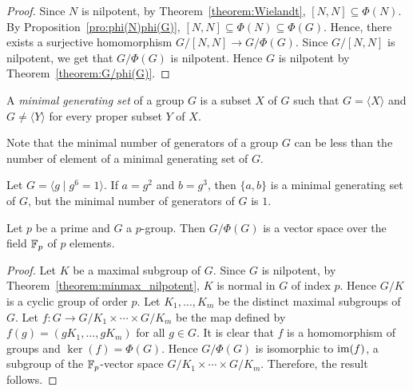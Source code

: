 \begin{proof}
	Since $N$ is nilpotent, by Theorem~\ref{theorem:Wielandt}, $[N,N]\subseteq\Phi(N)$.
	By Proposition~\ref{pro:phi(N)phi(G)},
	$[N,N]\subseteq\Phi(N)\subseteq\Phi(G)$. 
	Hence, there exists a surjective homomorphism
	$G/[N,N]\to G/\Phi(G)$. Since $G/[N,N]$ is nilpotent, we get that $G/\Phi(G)$ is nilpotent.
Hence $G$ is nilpotent by Theorem~\ref{theorem:G/phi(G)}.
\end{proof}

\begin{definition}
	A {\em minimal generating set} of a group $G$ is a subset $X$ of $G$ such that $G=\langle X\rangle$ and $G\neq \langle Y\rangle$ for every proper subset $Y$ of $X$.
\end{definition}

Note that the minimal number of generators of a group $G$ can be less than the number of element of a minimal generating set of $G$.
	
\begin{example}
	Let $G=\langle g\mid g^6=1\rangle$.  If $a=g^2$ and
	$b=g^3$, then $\{a,b\}$ is a minimal generating set of $G$,
	but the minimal number of generators of $G$ is $1$.
\end{example}
	
\begin{lemma}
	\label{lemma:Burnside:minimal}
	Let $p$ be a prime and 
	$G$ a $p$-group. Then $G/\Phi(G)$ is a vector space over the field $\mathbb{F}_p$ of $p$ elements.
\end{lemma}

\begin{proof}
	Let $K$ be a maximal subgroup of $G$. Since $G$ is nilpotent, by Theorem~\ref{theorem:minmax_nilpotent}, 
	$K$ is normal in $G$ of index $p$. Hence $G/K$ is a cyclic group of order $p$. 
	Let $K_1,\dots,K_m$ be the distinct maximal subgroups of $G$.
    Let $f\colon G\rightarrow G/K_1\times\cdots\times G/K_m$ be the map defined by $f(g)=(gK_1,\dots ,gK_m)$ for all $g\in G$.
    It is clear that $f$ is a homomorphism of groups and $\ker(f)=\Phi(G)$. Hence $G/\Phi(G)$ is isomorphic to $\operatorname{im}(f)$, a subgroup of 
    the $\mathbb{F}_p$-vector space $G/K_1\times\cdots\times G/K_m$. Therefore, the result follows.
\end{proof}

